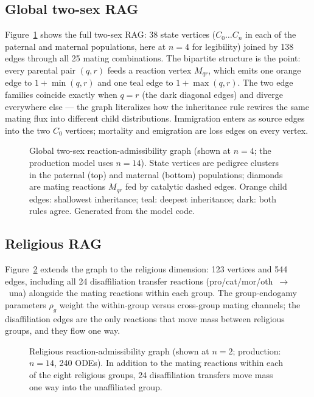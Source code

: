 \documentclass[11pt,a4paper]{article}
\begin{document}
\subsection{Global two-sex RAG}
\label{sec:rag-twosex}
Figure~\ref{fig:rag-twosex} shows the full two-sex RAG: 38 state
vertices ($C_0\dots C_n$ in each of the paternal and maternal
populations, here at $n=4$ for legibility) joined by 138 edges through
all 25 mating combinations.  The bipartite structure is the point:
every parental pair $(q,r)$ feeds a reaction vertex $M_{qr}$, which
emits one orange edge to $1+\min(q,r)$ and one teal edge to
$1+\max(q,r)$.  The two edge families coincide exactly when $q=r$
(the dark diagonal edges) and diverge everywhere else --- the graph
literalizes how the inheritance rule rewires the same mating flux into
different child distributions.  Immigration enters as source edges into
the two $C_0$ vertices; mortality and emigration are loss edges on
every vertex.
\begin{figure}[htbp]
  \centering
  \resizebox{\textwidth}{!}{}
  \caption{Global two-sex reaction-admissibility graph (shown at $n=4$;
  the production model uses $n=14$).  State vertices are pedigree
  clusters in the paternal (top) and maternal (bottom) populations;
  diamonds are mating reactions $M_{qr}$ fed by catalytic dashed edges.
  Orange child edges: shallowest inheritance; teal: deepest
  inheritance; dark: both rules agree.  Generated from the model code.}
  \label{fig:rag-twosex}
\end{figure}

\subsection{Religious RAG}
\label{sec:rag-religious}
Figure~\ref{fig:rag-religious} extends the graph to the religious
dimension: 123 vertices and 544 edges, including all 24 disaffiliation
transfer reactions (pro/cat/mor/oth~$\to$~una) alongside the mating
reactions within each group.  The group-endogamy parameters $\rho_g$
weight the within-group versus cross-group mating channels; the
disaffiliation edges are the only reactions that move mass between
religious groups, and they flow one way.
\begin{figure}[htbp]
  \centering
  \resizebox{\textwidth}{!}{}
  \caption{Religious reaction-admissibility graph (shown at $n=2$;
  production: $n=14$, 240 ODEs).  In addition to the mating reactions
  within each of the eight religious groups, 24 disaffiliation
  transfers move mass one way into the unaffiliated group.}
  \label{fig:rag-religious}
\end{figure}
\end{document}
